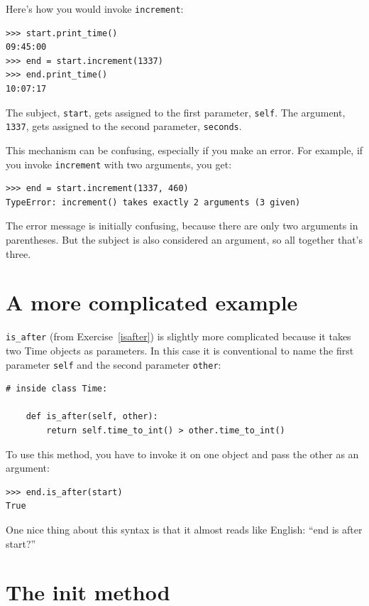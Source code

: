\documentclass[10pt]{book}
\begin{document}
\begin{CJK}{UTF8}{gbsn}
Here's how you would invoke {\tt increment}:

\begin{verbatim}
>>> start.print_time()
09:45:00
>>> end = start.increment(1337)
>>> end.print_time()
10:07:17
\end{verbatim}
%
The subject, {\tt start}, gets assigned to the first parameter,
{\tt self}.  The argument, {\tt 1337}, gets assigned to the
second parameter, {\tt seconds}.

This mechanism can be confusing, especially if you make an error.
For example, if you invoke {\tt increment} with two arguments, you
get:

\begin{verbatim}
>>> end = start.increment(1337, 460)
TypeError: increment() takes exactly 2 arguments (3 given)
\end{verbatim}
%
The error message is initially confusing, because there are
only two arguments in parentheses.  But the subject is also
considered an argument, so all together that's three.


\section{A more complicated example}

\verb"is_after" (from Exercise~\ref{isafter}) is slightly more complicated
because it takes two Time objects as parameters.  In this case it is
conventional to name the first parameter {\tt self} and the second
parameter {\tt other}:

\begin{verbatim}
# inside class Time:

    def is_after(self, other):
        return self.time_to_int() > other.time_to_int()
\end{verbatim}
%
To use this method, you have to invoke it on one object and pass
the other as an argument:

\begin{verbatim}
>>> end.is_after(start)
True
\end{verbatim}
%
One nice thing about this syntax is that it almost reads
like English: ``end is after start?''


\section{The init method}


\end{CJK}
\end{document}
